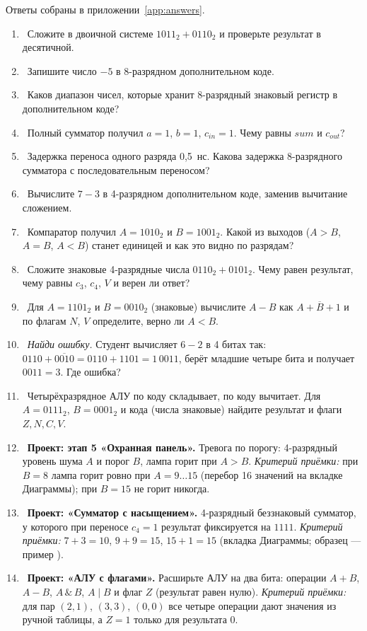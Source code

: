 Ответы собраны в приложении~\ref{app:answers}.

\begin{taskbox}
\begin{enumerate}
  \item {}~Сложите в двоичной системе $1011_2 + 0110_2$ и проверьте результат в десятичной.
  \item {}~Запишите число $-5$ в 8-разрядном дополнительном коде.
  \item {}~Каков диапазон чисел, которые хранит 8-разрядный знаковый регистр в дополнительном коде?
  \item {}~Полный сумматор получил $a=1$, $b=1$, $c_{in}=1$. Чему равны $sum$ и $c_{out}$?
  \item {}~Задержка переноса одного разряда 0,5~нс. Какова задержка 8-разрядного сумматора с последовательным переносом?
  \item {}~Вычислите $7 - 3$ в 4-разрядном дополнительном коде, заменив вычитание сложением.
  \item {}~Компаратор получил $A=1010_2$ и $B=1001_2$. Какой из выходов ($A>B$, $A=B$, $A<B$) станет единицей и как это видно по разрядам?
  \item {}~Сложите знаковые 4-разрядные числа $0110_2+0101_2$. Чему равен результат, чему равны $c_3$, $c_4$, $V$ и верен ли ответ?
  \item {}~Для $A=1101_2$ и $B=0010_2$ (знаковые) вычислите $A-B$ как $A+\overline{B}+1$ и по флагам $N$, $V$ определите, верно ли $A<B$.
  \item {}~\emph{Найди ошибку.} Студент вычисляет $6-2$ в 4 битах так: $0110+\overline{0010}=0110+1101=1\,0011$, берёт младшие четыре бита и получает $0011=3$. Где ошибка?
  \item {}~Четырёхразрядное АЛУ по коду  складывает, по коду  вычитает. Для $A=0111_2$, $B=0001_2$ и кода  (числа знаковые) найдите результат и флаги $Z,N,C,V$.
  \item {}~\textbf{Проект: этап 5 «Охранная панель».} Тревога по порогу: 4-разрядный уровень шума $A$ и порог $B$, лампа горит при $A>B$. \emph{Критерий приёмки:} при $B=8$ лампа горит ровно при $A=9\ldots 15$ (перебор 16 значений на вкладке Диаграммы); при $B=15$ не горит никогда.
  \item {}~\textbf{Проект: «Сумматор с насыщением».} 4-разрядный беззнаковый сумматор, у которого при переносе $c_4=1$ результат фиксируется на $1111$. \emph{Критерий приёмки:} $7+3=10$, $9+9=15$, $15+1=15$ (вкладка Диаграммы; образец --- пример ).
  \item {}~\textbf{Проект: «АЛУ с флагами».} Расширьте АЛУ на два бита: операции $A+B$, $A-B$, $A\,\&\,B$, $A\mid B$ и флаг $Z$ (результат равен нулю). \emph{Критерий приёмки:} для пар $(2,1)$, $(3,3)$, $(0,0)$ все четыре операции дают значения из ручной таблицы, а $Z=1$ только для результата $0$.
\end{enumerate}
\end{taskbox}

